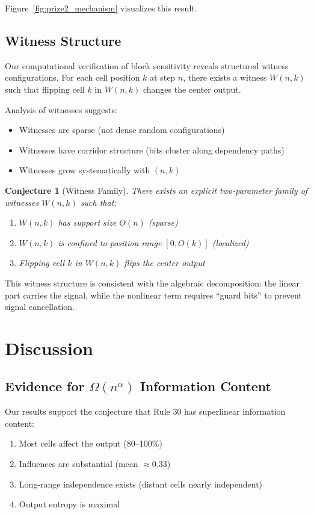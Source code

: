 \documentclass[11pt]{article}
\newtheorem{conjecture}[theorem]{Conjecture}
\begin{document}
Figure~\ref{fig:prize2_mechanism} visualizes this result.

\subsection{Witness Structure}

Our computational verification of block sensitivity reveals structured witness configurations. For each cell position $k$ at step $n$, there exists a witness $W(n,k)$ such that flipping cell $k$ in $W(n,k)$ changes the center output.

Analysis of witnesses suggests:
\begin{itemize}
    \item Witnesses are sparse (not dense random configurations)
    \item Witnesses have corridor structure (bits cluster along dependency paths)
    \item Witnesses grow systematically with $(n,k)$
\end{itemize}

\begin{conjecture}[Witness Family]
There exists an explicit two-parameter family of witnesses $W(n,k)$ such that:
\begin{enumerate}
    \item $W(n,k)$ has support size $O(n)$ (sparse)
    \item $W(n,k)$ is confined to position range $[0, O(k)]$ (localized)
    \item Flipping cell $k$ in $W(n,k)$ flips the center output
\end{enumerate}
\end{conjecture}

This witness structure is consistent with the algebraic decomposition: the linear part carries the signal, while the nonlinear term requires ``guard bits'' to prevent signal cancellation.

\section{Discussion}

\subsection{Evidence for $\Omega(n^\alpha)$ Information Content}

Our results support the conjecture that Rule 30 has superlinear information content:
\begin{enumerate}
    \item Most cells affect the output (80--100\%)
    \item Influences are substantial (mean $\approx 0.33$)
    \item Long-range independence exists (distant cells nearly independent)
    \item Output entropy is maximal
\end{enumerate}
\end{document}
